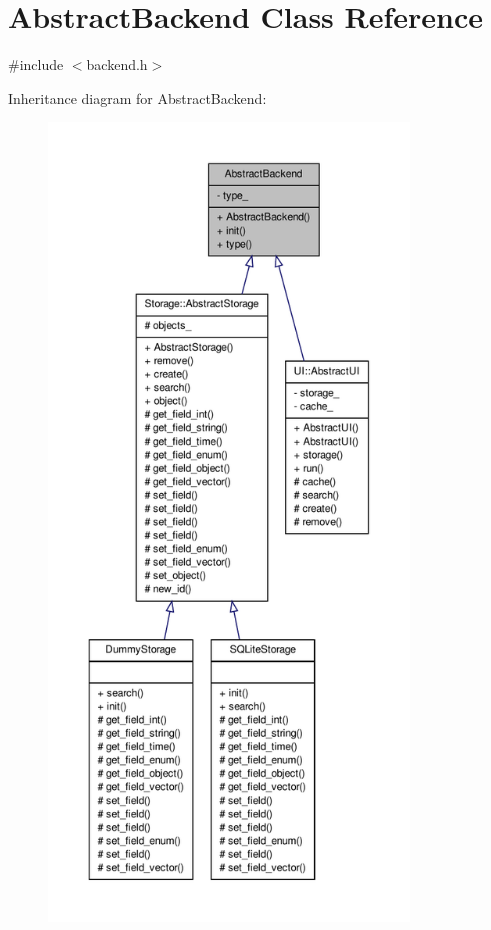 \hypertarget{classAbstractBackend}{
\section{AbstractBackend Class Reference}
\label{db/d37/classAbstractBackend}
}


{\ttfamily \#include $<$backend.h$>$}



Inheritance diagram for AbstractBackend:
\nopagebreak
\begin{figure}[H]
\begin{center}
\leavevmode
\includegraphics[height=600pt]{d7/dd9/classAbstractBackend__inherit__graph}
\end{center}
\end{figure}
